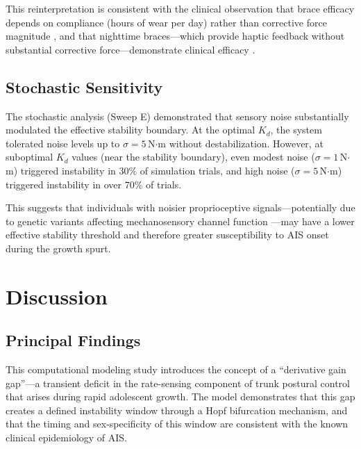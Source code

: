 \documentclass[12pt,a4paper]{article}
\begin{document}
This reinterpretation is consistent with the clinical observation that brace efficacy depends on compliance (hours of wear per day) rather than corrective force magnitude \citep{weinstein2013bracing, negrini2018sosort}, and that nighttime braces---which provide haptic feedback without substantial corrective force---demonstrate clinical efficacy \citep{price1997efficacy}.

\subsection{Stochastic Sensitivity}

The stochastic analysis (Sweep E) demonstrated that sensory noise substantially modulated the effective stability boundary. At the optimal $K_d$, the system tolerated noise levels up to $\sigma = 5$\,N$\cdot$m without destabilization. However, at suboptimal $K_d$ values (near the stability boundary), even modest noise ($\sigma = 1$\,N$\cdot$m) triggered instability in 30\% of simulation trials, and high noise ($\sigma = 5$\,N$\cdot$m) triggered instability in over 70\% of trials.

This suggests that individuals with noisier proprioceptive signals---potentially due to genetic variants affecting mechanosensory channel function \citep{assaraf2020piezo2, coste2010piezo}---may have a lower effective stability threshold and therefore greater susceptibility to AIS onset during the growth spurt.

\section{Discussion}

\subsection{Principal Findings}

This computational modeling study introduces the concept of a ``derivative gain gap''---a transient deficit in the rate-sensing component of trunk postural control that arises during rapid adolescent growth. The model demonstrates that this gap creates a defined instability window through a Hopf bifurcation mechanism, and that the timing and sex-specificity of this window are consistent with the known clinical epidemiology of AIS.
\end{document}
